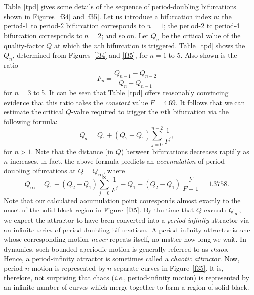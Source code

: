 Table~\ref{tpd} gives some details of the sequence of period-doubling bifurcations
shown in Figures~\ref{f34} and \ref{f35}. Let us introduce a bifurcation index $n$: the
period-1 to period-2 bifurcation corresponds to $n=1$;  the
period-2 to period-4 bifurcation corresponds to $n=2$; and so on. Let $Q_n$ be
the critical value of the quality-factor $Q$ at which the $n$th bifurcation is
triggered. Table~\ref{tpd} shows the $Q_n$, determined from  Figures~\ref{f34} and \ref{f35}, for
$n=1$ to 5. Also shown is the ratio
\begin{equation}
F_n = \frac{Q_{n-1}-Q_{n-2}}{Q_{n}-Q_{n-1}}
\end{equation}
for $n=3$ to 5. It can be seen that Table~\ref{tpd} offers reasonably
convincing  evidence that this ratio takes the {\em constant}\/ value $F=4.69$.
It follows that we can estimate the critical $Q$-value required to trigger the $n$th
 bifurcation via the following formula:
\begin{equation}
Q_n = Q_1 + (Q_2-Q_1)\sum_{j=0}^{n-2}\frac{1}{F^j},
\end{equation}
for $n>1$. Note that the distance (in $Q$) between bifurcations decreases rapidly as
$n$ increases. In fact, the above
formula predicts an {\em accumulation}\/ of period-doubling bifurcations at $Q=Q_\infty$, where
\begin{equation}
Q_\infty = Q_1 + (Q_2-Q_1)\sum_{j=0}^{\infty}\frac{1}{F^j} \equiv Q_1 + (Q_2-Q_1)\,\frac{F}{F-1}=
1.3758.
\end{equation}
Note that our calculated  accumulation point corresponds almost exactly to the onset of the 
solid black region in Figure~\ref{f35}.
By the time that $Q$ exceeds $Q_\infty$,  we expect the attractor to have been
converted into a {\em period-infinity}\/
attractor via an infinite series of period-doubling bifurcations. 
A period-infinity  attractor is one  whose corresponding motion {\em never}\/ repeats
itself, no matter
how long we wait. In dynamics, such bounded aperiodic motion is generally referred to as {\em chaos}. 
Hence, a period-infinity attractor is sometimes called a {\em chaotic attractor}. 
Now,  period-$n$ motion is represented by $n$ separate curves in Figure~\ref{f35}. 
It is, therefore, not surprising that chaos ({\em i.e.}, period-infinity motion) is
represented by an infinite number of curves which merge together to form a region of solid black.


